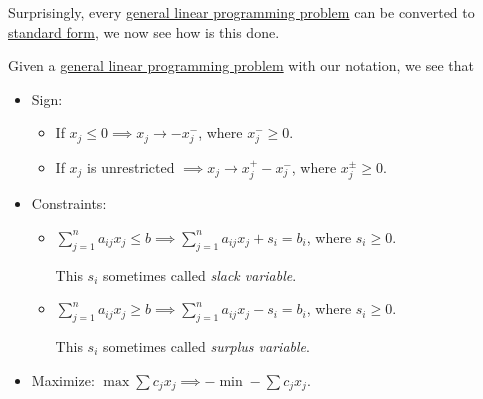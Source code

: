 \begin{remark}
	Surprisingly, every \hyperref[def:general-linear-programming-problem]{general linear programming problem} can be converted to \hyperref[def:standard-form]{standard form},
	we now see how is this done.
\end{remark}
\begin{explanation}
	Given a \hyperref[def:general-linear-programming-problem]{general linear programming problem} with our notation, we see that
	\begin{itemize}
		\item Sign:
		      \begin{itemize}
			      \item If \(x_{j}\leq 0 \implies x_j \to -x_j^-\), where \(x_{j}^- \geq 0\).
			      \item If \(x_{j}\) is unrestricted \(\implies x_j \to x_j^+ - x_{j}^-\), where \(x_j^{\pm} \geq 0\).
		      \end{itemize}
		\item Constraints:
		      \begin{itemize}
			      \item \(\sum\limits_{j=1}^{n} a_{ij} x_{j} \leq b \implies \sum\limits_{j=1}^{n} a_{ij} x_{j} + s_i = b_{i}\), where \(s_i \geq 0\).
			            \begin{definition}\label{def:slack-variable}
				            This \(s_i\) sometimes called \emph{slack variable}.
			            \end{definition}
			      \item \(\sum\limits_{j=1}^{n} a_{ij} x_{j} \geq b \implies \sum\limits_{j=1}^{n} a_{ij} x_{j} - s_i = b_{i}\), where \(s_i \geq 0\).
			            \begin{definition}\label{def:surplus-variable}
				            This \(s_i\) sometimes called \emph{surplus variable}.
			            \end{definition}
		      \end{itemize}
		\item Maximize: \(\max \sum c_{j}x_{j} \implies -\min -\sum c_{j}x_{j}\).
	\end{itemize}
\end{explanation}